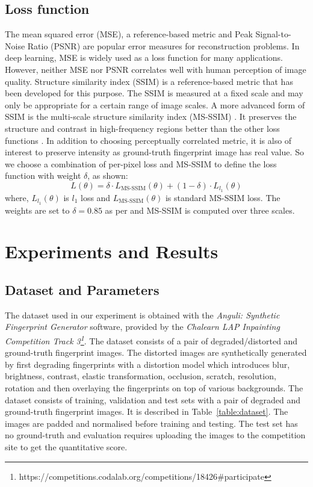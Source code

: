 \documentclass{llncs}
\begin{document}
\subsection{Loss function}
\label{ssec:loss}
\vspace{-0.2cm}
The mean squared error (MSE), a reference-based metric and Peak Signal-to-Noise Ratio (PSNR) are popular error measures for reconstruction problems. In deep learning, MSE is widely used as a loss function for many applications. However, neither MSE nor PSNR correlates well with human perception of image quality. Structure similarity index (SSIM) \cite{wang2004image} is a reference-based metric that has been developed for this purpose. The SSIM is measured at a fixed scale and may only be appropriate for a certain range of image scales. A more advanced form of SSIM is the multi-scale structure similarity index (MS-SSIM) \cite{wang2003multi}. It preserves the structure and contrast in high-frequency regions better than the other loss functions \cite{zhao2017loss}. In addition to choosing perceptually correlated metric, it is also of interest to preserve intensity as ground-truth fingerprint image has real value. So we choose a combination of per-pixel loss and MS-SSIM to define the loss function with weight $\delta$, as shown:
\begin{equation}
L(\theta) = \delta \cdot L_{\text{MS-SSIM}}(\theta) + (1-\delta) \cdot L_{l_1}(\theta)
\end{equation}
where, $L_{l_1}(\theta)$ is $l_1$ loss and $L_{\text{MS-SSIM}}(\theta)$ is standard MS-SSIM loss. The weights are set to $\delta = 0.85$ as per \cite{zhao2017loss} and MS-SSIM is computed over three scales.

\section{Experiments and Results}
\vspace{-0.2cm}
\subsection{Dataset and Parameters}
\label{ssec:dataset}
\vspace{-0.2cm}
The dataset used in our experiment is obtained with the \textit{Anguli: Synthetic Fingerprint Generator} software, provided by the \textit{Chalearn LAP Inpainting Competition Track 3\footnote{https://competitions.codalab.org/competitions/18426\#participate}}. The dataset consists of a pair of degraded/distorted and ground-truth fingerprint images. The distorted images are synthetically generated by first degrading fingerprints with a distortion model which introduces blur, brightness, contrast, elastic transformation, occlusion, scratch, resolution, rotation and then overlaying the fingerprints on top of various backgrounds. The dataset consists of training, validation and test sets with a pair of degraded and ground-truth fingerprint images. It is described in Table~\ref{table:dataset}. The images are padded and normalised before training and testing. The test set has no ground-truth and evaluation requires uploading the images to the competition site to get the quantitative score.
\end{document}
